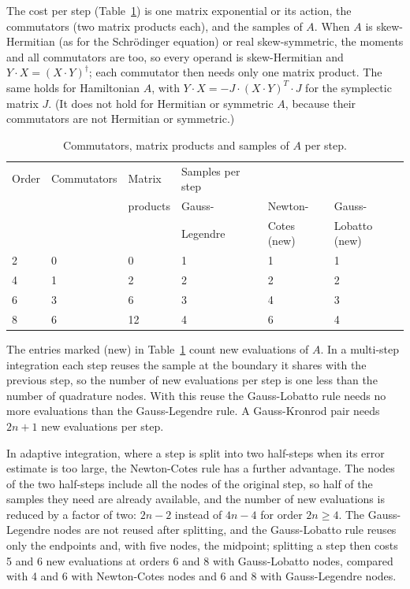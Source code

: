 \documentclass[12pt]{article}
\begin{document}
\noindent The cost per step (Table~\ref{tab:cost}) is one matrix exponential or its action, the commutators (two matrix products each), and the samples of $A$. When $A$ is skew-Hermitian (as for the Schrödinger equation) or real skew-symmetric, the moments and all commutators are too, so every operand is skew-Hermitian and $Y\cdot X=(X\cdot Y)^{\dagger}$; each commutator then needs only one matrix product. The same holds for Hamiltonian $A$, with $Y\cdot X=-J\cdot(X\cdot Y)^{T}\cdot J$ for the symplectic matrix $J$. (It does not hold for Hermitian or symmetric $A$, because their commutators are not Hermitian or symmetric.)

\begin{table}[H]
\centering\small
\caption{Commutators, matrix products and samples of $A$ per step.}\label{tab:cost}
\begin{tabular}{llllll}
\hline
Order & Commutators & Matrix & Samples per step &  &  \\
 &  & products & Gauss- & Newton- & Gauss- \\
 &  &  & Legendre & Cotes (new) & Lobatto (new) \\ \hline
2 & 0 & 0 & 1 & 1 & 1 \\
4 & 1 & 2 & 2 & 2 & 2 \\
6 & 3 & 6 & 3 & 4 & 3 \\
8 & 6 & 12 & 4 & 6 & 4 \\ \hline
\end{tabular}
\end{table}

The entries marked (new) in Table~\ref{tab:cost} count new evaluations of $A$. In a multi-step integration each step reuses the sample at the boundary it shares with the previous step, so the number of new evaluations per step is one less than the number of quadrature nodes. With this reuse the Gauss-Lobatto rule needs no more evaluations than the Gauss-Legendre rule. A Gauss-Kronrod pair needs $2n+1$ new evaluations per step.

In adaptive integration, where a step is split into two half-steps when its error estimate is too large, the Newton-Cotes rule has a further advantage. The nodes of the two half-steps include all the nodes of the original step, so half of the samples they need are already available, and the number of new evaluations is reduced by a factor of two: $2n-2$ instead of $4n-4$ for order $2n\ge4$. The Gauss-Legendre nodes are not reused after splitting, and the Gauss-Lobatto rule reuses only the endpoints and, with five nodes, the midpoint; splitting a step then costs 5 and 6 new evaluations at orders 6 and 8 with Gauss-Lobatto nodes, compared with 4 and 6 with Newton-Cotes nodes and 6 and 8 with Gauss-Legendre nodes.
\end{document}
